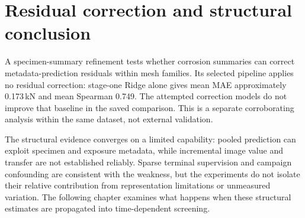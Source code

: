 \section{Residual correction and structural conclusion}
A specimen-summary refinement tests whether corrosion summaries can correct metadata-prediction residuals within mesh families. Its selected pipeline applies no residual correction: stage-one Ridge alone gives mean MAE approximately 0.173\,kN and mean Spearman 0.749. The attempted correction models do not improve that baseline in the saved comparison. This is a separate corroborating analysis within the same dataset, not external validation.

The structural evidence converges on a limited capability: pooled prediction can exploit specimen and exposure metadata, while incremental image value and transfer are not established reliably. Sparse terminal supervision and campaign confounding are consistent with the weakness, but the experiments do not isolate their relative contribution from representation limitations or unmeasured variation. The following chapter examines what happens when these structural estimates are propagated into time-dependent screening.
